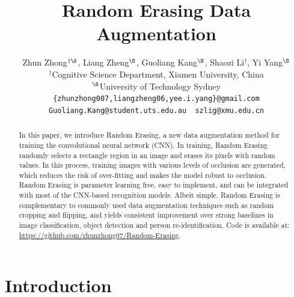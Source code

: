 \documentclass[10pt,twocolumn,letterpaper]{article}
\begin{document}
\title{Random Erasing Data Augmentation}

\author{Zhun Zhong$^{\dag \S}$, Liang Zheng$^{\S}$, Guoliang Kang$^{\S}$, Shaozi Li$^{\dag}$, Yi Yang$^{\S}$ \\
 {$^{\dag}$Cognitive Science Department, Xiamen University, China} \\
 {$^{\S}$University of Technology Sydney}\\ 
{\tt\small \{zhunzhong007,liangzheng06,yee.i.yang\}@gmail.com} \\
{\tt\small Guoliang.Kang@student.uts.edu.au~  szlig@xmu.edu.cn} 
}

\maketitle

\begin{abstract}
   In this paper, we introduce Random Erasing, a new data augmentation method for training the convolutional neural network (CNN). 
In training, Random Erasing randomly selects a rectangle region in an image and erases its pixels with random values. In this process, training images with various levels of occlusion are generated, which reduces the risk of over-fitting and makes the model robust to occlusion. Random Erasing is parameter learning free, easy to implement, and can be integrated with most of the CNN-based recognition models. Albeit simple, Random Erasing is complementary to commonly used data augmentation techniques such as random cropping and flipping, and yields consistent improvement over strong baselines in image classification, object detection and person re-identification. Code is available at: \url{https://github.com/zhunzhong07/Random-Erasing}.

   
\end{abstract}

\section{Introduction}
      
\end{document}
